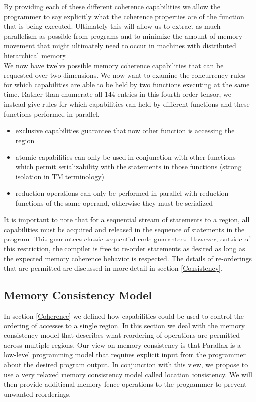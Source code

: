 \documentclass{article}
\theoremstyle{definition}
\begin{document}
\noindent
By providing each of these different coherence capabilities we allow the programmer
to say explicitly what the coherence properties are of the function that is
being executed.  Ultimately this will allow us to extract as much parallelism
as possible from programs and to minimize the amount of memory movement that
might ultimately need to occur in machines with distributed hierarchical memory. \\

\noindent
We now have twelve possible memory coherence capabilities that can be requested
over two dimensions.  We now want to examine the concurrency rules for which
capabilities are able to be held by two functions executing at the same time.  Rather
than enumerate all 144 entries in this fourth-order tensor, we instead give rules
for which capabilities can held by different functions and these functions performed in parallel. 

\begin{itemize}
\item exclusive capabilities guarantee that now other function is accessing the region
\item atomic capabilities can only be used in conjunction with other functions which permit
serializability with the statements in those functions (strong isolation in TM terminology)
\item reduction operations can only be performed in parallel with reduction functions of
the same operand, otherwise they must be serialized
\end{itemize}

\noindent
It is important to note that for a sequential stream of statements to a region, all
capabilities must be acquired and released in the sequence of statements in the
program.  This guarantees classic sequential code guarantees.  However, outside
of this restriction, the compiler is free to re-order statements as desired as long
as the expected memory coherence behavior is respected.  The details of re-orderings
that are permitted are discussed in more detail in section \ref{Consistency}. 

\subsection{Memory Consistency Model \label{Consistency}}
\noindent
In section \ref{Coherence} we defined how capabilities could be used to
control the ordering of accesses to a single region.  In this section we deal
with the memory consistency model that describes what reordering of operations
are permitted across multiple regions.  Our view on memory consistency is
that Parallax is a low-level programming model that requires explicit input
from the programmer about the desired program output.  In conjunction with 
this view, we propose to use a very relaxed memory consistency model
called location consistency\cite{Frigo98}.   We will then provide additional
memory fence operations to the programmer to prevent unwanted reorderings.\\
\end{document}
